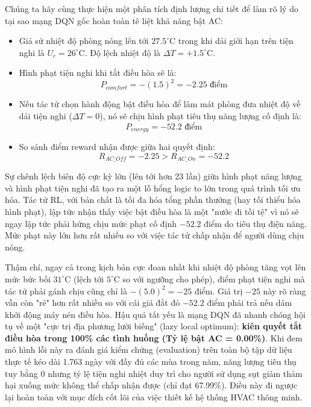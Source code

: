 \documentclass[12pt, a4paper]{report}
\begin{document}
Chúng ta hãy cùng thực hiện một phân tích định lượng chi tiết để làm rõ lý do tại sao mạng DQN gốc hoàn toàn tê liệt khả năng bật AC:
\begin{itemize}
    \item Giả sử nhiệt độ phòng nóng lên tới $27.5^\circ\text{C}$ trong khi dải giới hạn trên tiện nghi là $U_c = 26^\circ\text{C}$. Độ lệch nhiệt độ là $\Delta T = +1.5^\circ\text{C}$.
    \item Hình phạt tiện nghi khi tắt điều hòa sẽ là:
    \begin{equation}
    P_{comfort} = -(1.5)^2 = -2.25 \text{ điểm}
    \end{equation}
    \item Nếu tác tử chọn hành động bật điều hòa để làm mát phòng đưa nhiệt độ về dải tiện nghi ($\Delta T = 0$), nó sẽ chịu hình phạt tiêu thụ năng lượng cố định là:
    \begin{equation}
    P_{energy} = -52.2 \text{ điểm}
    \end{equation}
    \item So sánh điểm reward nhận được giữa hai quyết định:
    \begin{equation}
    R_{AC\_Off} = -2.25 > R_{AC\_On} = -52.2
    \end{equation}
\end{itemize}
Sự chênh lệch biên độ cực kỳ lớn (lên tới hơn 23 lần) giữa hình phạt năng lượng và hình phạt tiện nghi đã tạo ra một lỗ hổng logic to lớn trong quá trình tối ưu hóa. Tác tử RL, với bản chất là tối đa hóa tổng phần thưởng (hay tối thiểu hóa hình phạt), lập tức nhận thấy việc bật điều hòa là một "nước đi tồi tệ" vì nó sẽ ngay lập tức phải hứng chịu mức phạt cố định $-52.2$ điểm do tiêu thụ điện năng. Mức phạt này lớn hơn rất nhiều so với việc tác tử chấp nhận để người dùng chịu nóng.

Thậm chí, ngay cả trong kịch bản cực đoan nhất khi nhiệt độ phòng tăng vọt lên mức bức bối $31^\circ\text{C}$ (lệch tới $5^\circ\text{C}$ so với ngưỡng cho phép), điểm phạt tiện nghi mà tác tử phải gánh chịu cũng chỉ là $-(5.0)^2 = -25$ điểm. Giá trị $-25$ này rõ ràng vẫn còn "rẻ" hơn rất nhiều so với cái giá đắt đỏ $-52.2$ điểm phải trả nếu dám khởi động máy nén điều hòa. Hậu quả tất yếu là mạng DQN đã nhanh chóng hội tụ về một "cực trị địa phương lười biếng" (lazy local optimum): \textbf{kiên quyết tắt điều hòa trong 100\% các tình huống (Tỷ lệ bật AC = 0.00\%)}. Khi đem mô hình lỗi này ra đánh giá kiểm chứng (evaluation) trên toàn bộ tập dữ liệu thực tế kéo dài 1.763 ngày với đầy đủ các mùa trong năm, năng lượng tiêu thụ tuy bằng 0 nhưng tỷ lệ tiện nghi nhiệt duy trì cho người sử dụng sụt giảm thảm hại xuống mức không thể chấp nhận được (chỉ đạt 67.99\%). Điều này đi ngược lại hoàn toàn với mục đích cốt lõi của việc thiết kế hệ thống HVAC thông minh.
\end{document}
